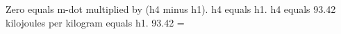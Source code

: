 Zero equals m-dot multiplied by (h4 minus h1).  
h4 equals h1.  
h4 equals 93.42 kilojoules per kilogram equals h1.  
93.42 =